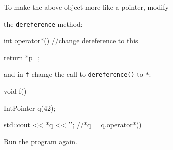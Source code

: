 To make the above object more like a pointer, modify

the \texttt{dereference} method:



\begin{consolethree}[escapeinside=||]

int operator*() //change dereference to this

{

    return *p_;

}

\end{consolethree}



and in \texttt{f} change the call to \texttt{dereference()} to \texttt{*}:



\begin{consolethree}[escapeinside=||]

void f()

{

    IntPointer q(42);

    std::cout << *q << '\n'; //*q = q.operator*()

}

\end{consolethree}



Run the program again.

